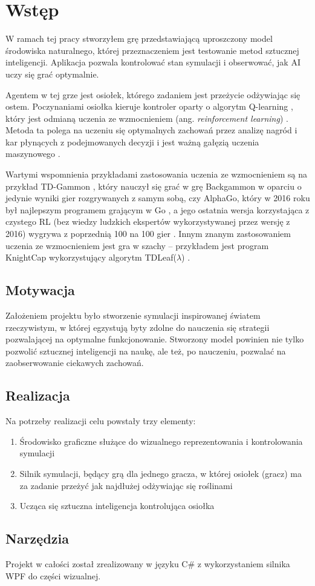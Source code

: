 \chapter{Wstęp}
W ramach tej pracy stworzyłem grę przedstawiającą uproszczony model środowiska naturalnego, której przeznaczeniem jest testowanie metod sztucznej inteligencji. Aplikacja pozwala kontrolować stan symulacji i obserwować, jak AI uczy się grać optymalnie.

Agentem w tej grze jest osiołek, którego zadaniem jest przeżycie odżywiając się ostem. Poczynaniami osiołka kieruje kontroler oparty o algorytm Q-learning \cite{wiki:Qlearning}, który jest odmianą uczenia ze wzmocnieniem (ang. \textit{reinforcement learning}) \cite{Sutton1998Introduction}. Metoda ta polega na uczeniu się optymalnych zachowań przez analizę nagród i kar płynących z podejmowanych decyzji i jest ważną gałęzią uczenia maszynowego \cite{Sutton1988Learning}.  

Wartymi wspomnienia przykładami zastosowania uczenia ze wzmocnieniem są na przykład TD-Gammon \cite{Tesauro1994TDGammon}, który nauczył się grać w grę Backgammon w oparciu o jedynie wyniki gier rozgrywanych z samym sobą, czy AlphaGo, który w 2016 roku był najlepszym programem grającym w Go \cite{Silver2016Mastering}, a jego ostatnia wersja korzystająca z czystego RL (bez wiedzy ludzkich ekspertów wykorzystywanej przez wersję z 2016) wygrywa z poprzednią 100 na 100 gier \cite{silver2017mastering}. Innym znanym zastosowaniem uczenia ze wzmocnieniem jest gra w szachy -- przykładem jest program KnightCap wykorzystujący algorytm TDLeaf($\lambda$) \cite{Baxter2000Learning}.


\section{Motywacja}
Założeniem projektu było stworzenie symulacji inspirowanej światem rzeczywistym, w której egzystują byty zdolne do nauczenia się strategii pozwalającej na optymalne funkcjonowanie. Stworzony model powinien nie tylko pozwolić sztucznej inteligencji na naukę, ale też, po nauczeniu, pozwalać na zaobserwowanie ciekawych zachowań.


\section{Realizacja}
Na potrzeby realizacji celu powstały trzy elementy:

\begin{enumerate}
    \item Środowisko graficzne służące do wizualnego reprezentowania i kontrolowania symulacji
    \item Silnik symulacji, będący grą dla jednego gracza, w której osiołek (gracz) ma za zadanie przeżyć jak najdłużej odżywiając się roślinami
    \item Ucząca się sztuczna inteligencja kontrolująca osiołka
\end{enumerate}

\section{Narzędzia}
Projekt w całości został zrealizowany w języku C\# z wykorzystaniem silnika WPF do części wizualnej.


